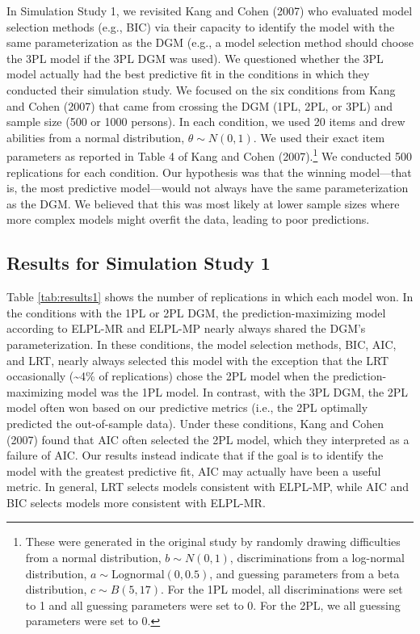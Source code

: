 \documentclass[
  english,
  man,floatsintext]{apa7}
\begin{document}
In Simulation Study 1, we revisited Kang and Cohen (2007) who evaluated model selection methods (e.g., BIC) via their capacity to identify the model with the same parameterization as the DGM (e.g., a model selection method should choose the 3PL model if the 3PL DGM was used). We questioned whether the 3PL model actually had the best predictive fit in the conditions in which they conducted their simulation study. We focused on the six conditions from Kang and Cohen (2007) that came from crossing the DGM (1PL, 2PL, or 3PL) and sample size (500 or 1000 persons). In each condition, we used 20 items and drew abilities from a normal distribution, \(\theta \sim N(0, 1)\). We used their exact item parameters as reported in Table 4 of Kang and Cohen (2007).\footnote{These were generated in the original study by randomly drawing difficulties from a normal distribution, \(b \sim N(0, 1)\), discriminations from a log-normal distribution, \(a \sim \text{Lognormal}(0, 0.5)\), and guessing parameters from a beta distribution, \(c \sim B(5, 17)\). For the 1PL model, all discriminations were set to 1 and all guessing parameters were set to 0. For the 2PL, we all guessing parameters were set to 0.} We conducted 500 replications for each condition. Our hypothesis was that the winning model---that is, the most predictive model---would not always have the same parameterization as the DGM. We believed that this was most likely at lower sample sizes where more complex models might overfit the data, leading to poor predictions.

\hypertarget{results-for-simulation-study-1}{%
\subsection{Results for Simulation Study 1}\label{results-for-simulation-study-1}}

Table \ref{tab:results1} shows the number of replications in which each model won. In the conditions with the 1PL or 2PL DGM, the prediction-maximizing model according to ELPL-MR and ELPL-MP nearly always shared the DGM's parameterization. In these conditions, the model selection methods, BIC, AIC, and LRT, nearly always selected this model with the exception that the LRT occasionally (\textasciitilde4\% of replications) chose the 2PL model when the prediction-maximizing model was the 1PL model. In contrast, with the 3PL DGM, the 2PL model often won based on our predictive metrics (i.e., the 2PL optimally predicted the out-of-sample data). Under these conditions, Kang and Cohen (2007) found that AIC often selected the 2PL model, which they interpreted as a failure of AIC. Our results instead indicate that if the goal is to identify the model with the greatest predictive fit, AIC may actually have been a useful metric. In general, LRT selects models consistent with ELPL-MP, while AIC and BIC selects models more consistent with ELPL-MR.
\end{document}
